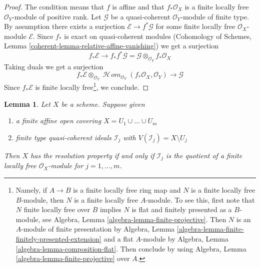 \documentclass{stacks-project}
\theoremstyle{plain}
\newtheorem{lemma}[subsection]{Lemma}
\theoremstyle{definition}
\theoremstyle{remark}
\numberwithin{equation}{subsection}
\def\SheafHom{\mathop{\mathcal{H}\!\mathit{om}}\nolimits}
\begin{document}
\begin{proof}
The condition means that $f$ is affine and that $f_*\mathcal{O}_X$
is a finite locally free $\mathcal{O}_Y$-module of positive rank.
Let $\mathcal{G}$ be a quasi-coherent $\mathcal{O}_Y$-module
of finite type. By assumption there exists a surjection
$\mathcal{E} \to f^*\mathcal{G}$ for some finite locally free
$\mathcal{O}_X$-module $\mathcal{E}$. Since $f_*$ is exact on
quasi-coherent modules
(Cohomology of Schemes, Lemma \ref{coherent-lemma-relative-affine-vanishing})
we get a surjection
$$
f_*\mathcal{E}
\longrightarrow
f_*f^*\mathcal{G} = \mathcal{G} \otimes_{\mathcal{O}_Y} f_*\mathcal{O}_X
$$
Taking duals we get a surjection
$$
f_*\mathcal{E}
\otimes_{\mathcal{O}_Y}
\SheafHom_{\mathcal{O}_Y}(f_*\mathcal{O}_X, \mathcal{O}_Y)
\longrightarrow
\mathcal{G}
$$
Since $f_*\mathcal{E}$ is finite locally free\footnote{Namely,
if $A \to B$ is a finite locally free ring map
and $N$ is a finite locally free $B$-module, then $N$
is a finite locally free $A$-module. To see this, first note
that $N$ finite locally free over $B$ implies $N$ is
flat and finitely presented as a $B$-module, see
Algebra, Lemma \ref{algebra-lemma-finite-projective}. Then
$N$ is an $A$-module of finite presentation by
Algebra, Lemma \ref{algebra-lemma-finite-finitely-presented-extension}
and a flat $A$-module by Algebra, Lemma \ref{algebra-lemma-composition-flat}.
Then conclude by using
Algebra, Lemma \ref{algebra-lemma-finite-projective} over $A$.},
we conclude.
\end{proof}

\begin{lemma}
\label{lemma-resolution-property-finite-number}
Let $X$ be a scheme. Suppose given
\begin{enumerate}
\item a finite affine open covering $X = U_1 \cup \ldots \cup U_m$
\item finite type quasi-coherent ideals $\mathcal{I}_j$
with $V(\mathcal{I}_j) = X \setminus U_j$
\end{enumerate}
Then $X$ has the resolution property if and only if $\mathcal{I}_j$
is the quotient of a finite locally free $\mathcal{O}_X$-module
for $j = 1, \ldots, m$.
\end{lemma}
\end{document}
